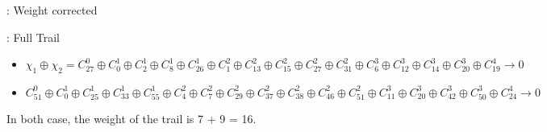 \documentclass[aspectratio=169,9pt]{beamer}
\begin{document}

\begin{frame}{\MiniMORUS[640] : Weight corrected}

  \begin{figure}
    \resizebox{!}{0.90\textheight}{%
      
    }
  \end{figure}

\end{frame}



\begin{frame}{\MiniMORUS : Full Trail}

\begin{itemize}
  \item \MiniMORUS[640]
  $$\chi_1 \oplus \chi_2 = C^0_{27} \oplus C^1_{0} \oplus C^1_{2} \oplus C^1_{8} \oplus C^1_{26} \oplus C^2_{1} \oplus C^2_{13} \oplus C^2_{15} \oplus
   C^2_{27} \oplus C^2_{31} \oplus C^3_{6} \oplus C^3_{12} \oplus C^3_{14} \oplus C^3_{20} \oplus C^4_{19} \to 0$$
   \item \MiniMORUS[1280]
  $$C^0_{51} \oplus C^1_{0} \oplus C^1_{25} \oplus C^1_{33} \oplus C^1_{55} \oplus C^2_{4} \oplus C^2_{7} \oplus C^2_{29} \oplus C^2_{37} \oplus
  C^2_{38} \oplus C^2_{46} \oplus C^2_{51} \oplus C^3_{11} \oplus C^3_{20} \oplus C^3_{42} \oplus C^3_{50} \oplus C^4_{24} \to 0$$
\end{itemize}

  In both case, the weight of the trail is 7 + 9 = 16.

\end{frame}

\end{document}
